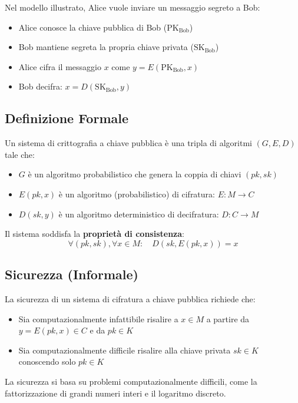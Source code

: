 \documentclass{report}
\begin{document}
Nel modello illustrato, Alice vuole inviare un messaggio segreto a Bob:
\begin{itemize}
  \item Alice conosce la chiave pubblica di Bob ($\text{PK}_{\text{Bob}}$)
  \item Bob mantiene segreta la propria chiave privata ($\text{SK}_{\text{Bob}}$)
  \item Alice cifra il messaggio $x$ come $y = E(\text{PK}_{\text{Bob}}, x)$
  \item Bob decifra: $x = D(\text{SK}_{\text{Bob}}, y)$
\end{itemize}

\subsection{Definizione Formale}

Un sistema di crittografia a chiave pubblica \`e una tripla di algoritmi $(G, E, D)$ tale che:
\begin{itemize}
  \item $G$ \`e un algoritmo probabilistico che genera la coppia di chiavi $(pk, sk)$
  \item $E(pk, x)$ \`e un algoritmo (probabilistico) di cifratura: $E: M \rightarrow C$
  \item $D(sk, y)$ \`e un algoritmo deterministico di decifratura: $D: C \rightarrow M$
\end{itemize}

Il sistema soddisfa la \textbf{propriet\`a di consistenza}:
\begin{equation}
\forall (pk, sk), \forall x \in M: \quad D(sk, E(pk, x)) = x
\end{equation}

\subsection{Sicurezza (Informale)}

La sicurezza di un sistema di cifratura a chiave pubblica richiede che:
\begin{itemize}
  \item Sia computazionalmente infattibile risalire a $x \in M$ a partire da $y = E(pk, x) \in C$ e da $pk \in K$
  \item Sia computazionalmente difficile risalire alla chiave privata $sk \in K$ conoscendo solo $pk \in K$
\end{itemize}

La sicurezza si basa su problemi computazionalmente difficili, come la fattorizzazione di grandi numeri interi e il logaritmo discreto.
\end{document}

